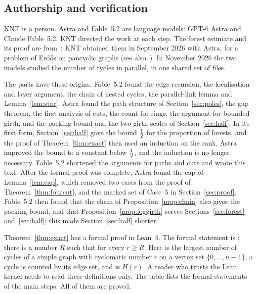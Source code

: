 \subsection{Authorship and verification}\label{sec:status}

KNT is a person. Astra and Fable~5.2 are language models: GPT-6 Astra and Claude Fable~5.2. KNT
directed the work at each step. The forest estimate and its proof are from~\cite{KNT}; KNT
obtained them in September 2026 with Astra, for a problem of Erd\H{o}s on pancyclic graphs (see
also~\cite{Pan}). In November 2026 the two models studied the number of cycles in parallel, in one
shared set of files.

The parts have these origins. Fable~5.2 found the edge recursion, the localisation and layer
argument, the chain of nested cycles, the parallel-link lemma and Lemma~\ref{lem:star}. Astra found
the path structure of Section~\ref{sec:poles}, the gap theorem, the first analysis of cuts, the
count for rings, the argument for bounded girth, and the packing bound and the two girth scales of
Section~\ref{sec:half}. In its first form, Section~\ref{sec:half} gave the bound $\tfrac12$ for the
proportion of forests, and the proof of Theorem~\ref{thm:exact} then used an induction on the
rank. Astra improved the bound to a constant below $\tfrac12$, and the induction is no longer
necessary. Fable~5.2 shortened the arguments for paths and cuts and wrote this text. After the
formal proof was complete, Astra found the cap of Lemma~\ref{lem:cap}, which removed two cases
from the proof of Theorem~\ref{thm:fourcut}, and the marked set of Case~5 in
Section~\ref{sec:proof}. Fable~5.2 then found that the chain of
Proposition~\ref{prop:chain} also gives the packing bound, and that
Proposition~\ref{prop:loggirth} serves Sections~\ref{sec:forest} and~\ref{sec:half}; this made
Section~\ref{sec:half} shorter.

Theorem~\ref{thm:exact} has a formal proof in Lean~4. The formal statement is
: there is a number $R$ such that
 for every $r\ge R$. Here  is the largest number
of cycles of a simple graph with cyclomatic number $r$ on a vertex set $\{0,\dots,n-1\}$, a cycle
is counted by its edge set, and  is $H(r)$. A reader who trusts the Lean kernel
needs to read these definitions only. The table lists the formal statements of the main steps.
All of them are proved.

